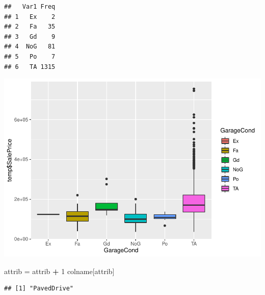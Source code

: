\documentclass[]{article}
\newenvironment{Shaded}{\begin{snugshade}}{\end{snugshade}}
\newcommand{\DecValTok}[1]{\textcolor[rgb]{0.00,0.00,0.81}{#1}}
\newcommand{\StringTok}[1]{\textcolor[rgb]{0.31,0.60,0.02}{#1}}
\newcommand{\OperatorTok}[1]{\textcolor[rgb]{0.81,0.36,0.00}{\textbf{#1}}}
\newcommand{\NormalTok}[1]{#1}
\begin{document}
\begin{verbatim}
##   Var1 Freq
## 1   Ex    2
## 2   Fa   35
## 3   Gd    9
## 4  NoG   81
## 5   Po    7
## 6   TA 1315
\end{verbatim}

\includegraphics{EDA_files/figure-latex/unnamed-chunk-87-1.pdf}

\begin{Shaded}
\begin{Highlighting}[]
\NormalTok{attrib =}\StringTok{ }\NormalTok{attrib }\OperatorTok{+}\StringTok{ }\DecValTok{1}
\NormalTok{colname[attrib]}
\end{Highlighting}
\end{Shaded}

\begin{verbatim}
## [1] "PavedDrive"
\end{verbatim}
\end{document}
